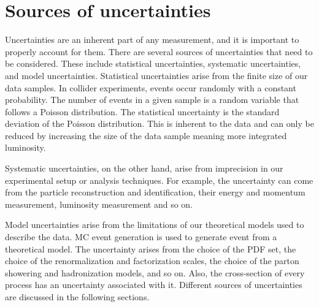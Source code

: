 \section{Sources of uncertainties}
\label{sec:sources-of-uncertainties}
Uncertainties are an inherent part of any measurement, and it is important to properly account for them. There are several sources of uncertainties that need to be considered. These include statistical uncertainties, systematic uncertainties, and model uncertainties. Statistical uncertainties arise from the finite size of our data samples. In collider experiments, events occur randomly with a constant probability. The number of events in a given sample is a random variable that follows a Poisson distribution. The statistical uncertainty is the standard deviation of the Poisson distribution. This is inherent to the data and can only be reduced by increasing the size of the data sample meaning more integrated luminosity.

Systematic uncertainties, on the other hand, arise from imprecision in our experimental setup or analysis techniques. For example, the uncertainty can come from the particle reconstruction and identification, their energy and momentum measurement, luminosity measurement and so on.

Model uncertainties arise from the limitations of our theoretical models used to describe the data. MC event generation is used to generate event from a theoretical model. The uncertainty arises from the choice of the PDF set, the choice of the renormalization and factorization scales, the choice of the parton showering and hadronization models, and so on. Also, the cross-section of every process has an uncertainty associated with it. Different sources of uncertainties are discussed in the following sections. 


